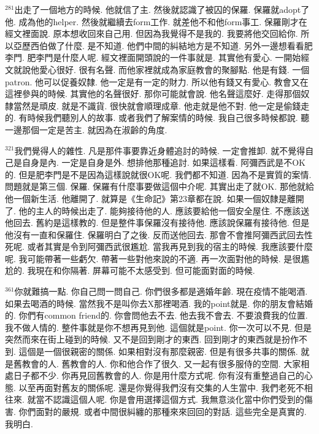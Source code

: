 \documentclass{book}
\begin{document}
$^{281}$出走了一個地方的時候.
他就信了主.
然後就認識了被囚的保羅.
保羅就adopt了他.
成為他的helper.
然後就繼續去form工作.
就差他不和他form事工.
保羅剛才在經文裡面說.
原本想收回來自己用.
但因為我覺得不是我的.
我要將他交回給你.
所以亞歷西伯做了什麼.
是不知道.
他們中間的糾結地方是不知道.
另外一邊想看看肥李門.
肥李門是什麼人呢.
經文裡面開頭說的一件事就是.
其實他有愛心.
一開始經文就說他愛心很好.
很有名聲.
而他家裡就成為家庭教會的聚腳點.
他是有錢.
一個patron.
他可以促養奴隸.
他一定是有一定的財力.
所以他有錢又有愛心.
教會又在這裡參與的時候.
其實他的名聲很好.
那你可能就會說.
他名聲這麼好.
走得那個奴隸當然是頑皮.
就是不識貨.
很快就會順理成章.
他走就是他不對.
他一定是偷錢走的.
有時候我們聽別人的故事.
或者我們了解案情的時候.
我自己很多時候都說.
聽一邊那個一定是苦主.
就因為在淑齡的角度.

$^{321}$我們覺得人的雜性.
凡是那件事要靠近身體追討的時候.
一定會推卸.
就不覺得自己是自身是內.
一定是自身是外.
想排他那種追討.
如果這樣看.
阿彌西武是不OK的.
但是肥李門是不是因為這樣說就很OK呢.
我們都不知道.
因為不是實質的案情.
問題就是第三個.
保羅.
保羅有什麼事要做這個中介呢.
其實出走了就OK.
那他就給他一個新生活.
他離開了.
就算是《生命記》第23章都在說.
如果一個奴隸是離開了.
他的主人的時候出走了.
能夠接待他的人.
應該要給他一個安全屋住.
不應該送他回去.
舊約是這樣教的.
但是整件事保羅沒有接待他.
應該說保羅有接待他.
但是他沒有一直和保羅住.
保羅明白了之後.
反而送他回去.
那會不會推阿彌西武回去性死呢.
或者其實是令到阿彌西武很尷尬.
當我再見到我的宿主的時候.
我應該要什麼呢.
我可能帶著一些虧欠.
帶著一些對他來說的不適.
再一次面對他的時候.
是很尷尬的.
我現在和你隔著.
屏幕可能不太感受到.
但可能面對面的時候.

$^{361}$你就難搞一點.
你自己問一問自己.
你們很多都是適婚年齡.
現在疫情不能喝酒.
如果去喝酒的時候.
當然我不是叫你去X那裡喝酒.
我的point就是.
你的朋友會結婚的.
你們有common friend的.
你會問他去不去.
他去我不會去.
不要浪費我的位置.
我不做人情的.
整件事就是你不想再見到他.
這個就是point.
你一次可以不見.
但是突然而來在街上碰到的時候.
又不是回到剛才的東西.
回到剛才的東西就是扮作不到.
這個是一個很親密的關係.
如果相對沒有那麼親密.
但是有很多共事的關係.
就是舊教會的人.
舊教會的人.
你和他合作了很久.
又一起有很多服侍的空間.
大家相處日子都不少.
你再見回舊教會的人.
你是用什麼方式呢.
你有沒有重整過自己的心態.
以至再面對舊友的關係呢.
還是你覺得我們沒有交集的人生當中.
我們老死不相往來.
就當不認識這個人呢.
你是會用選擇這個方式.
我無意淡化當中你們受到的傷害.
你們面對的嚴規.
或者中間很糾纏的那種來來回回的對話.
這些完全是真實的.
我明白.
\end{document}
